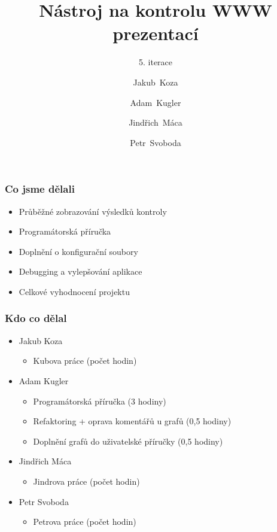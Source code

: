 \documentclass{beamer}
\begin{document}
\title [NKWP]{Nástroj na kontrolu WWW prezentací}
\author[J.~ Koza, A.~ Kugler, J.~Máca, P.~Svoboda]{Jakub~Koza \and Adam~Kugler \and Jindřich~Máca \and Petr~Svoboda}

\subtitle{5. iterace}
\frame{\titlepage}
\begin{frame}[allowframebreaks]\frametitle{Co jsme dělali}
   \begin{itemize}
    \item Průběžné zobrazování výsledků kontroly
		\item Programátorská příručka
		\item Doplnění o konfigurační soubory
		\item Debugging a vylepšování aplikace
		\item Celkové vyhodnocení projektu
   \end{itemize}
\end{frame}

\begin{frame}[allowframebreaks]\frametitle{Kdo co dělal} 
  \begin{itemize}
    \item Jakub Koza
      \begin{itemize}
       \item Kubova práce (počet hodin)
     \end{itemize}

    \item Adam Kugler
      \begin{itemize}
       \item Programátorská příručka (3 hodiny)
       \item Refaktoring + oprava komentářů u grafů (0,5 hodiny)
       \item Doplnění grafů do uživatelské příručky (0,5 hodiny)
     \end{itemize}

    \item Jindřich Máca
      \begin{itemize}
       \item Jindrova práce (počet hodin)
     \end{itemize}

    \item Petr Svoboda
      \begin{itemize}
       \item Petrova práce (počet hodin)
     \end{itemize}
   \end{itemize}  
\end{frame} 
\end{document}
